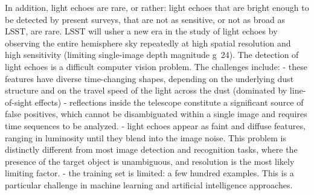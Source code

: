 \documentclass{proposalnsf}
\begin{document}
In addition, light echoes are rare, or rather: light echoes that are bright enough to be detected by present surveys, that are not as sensitive, or not as broad as LSST, are rare. LSST will usher a new era in the study of light echoes by observing the entire hemisphere sky repeatedly at high spatial resolution and high sensitivity (limiting single-image depth magnitude g~24). 
The detection of light echoes is a difficult computer vision problem.  The challenges include:
- these features have diverse time-changing shapes, depending on the underlying dust structure and on the travel speed of the light across the dust (dominated by line-of-sight effects)
- reflections inside the telescope constitute a significant source of false positives, which cannot be disambiguated within a single image and requires time sequences to be analyzed.
- light echoes appear as faint and diffuse features, ranging in luminosity until they blend into the image noise.  This problem is distinctly different from most image detection and recognition tasks, where the presence of the target object is unambiguous, and resolution is the most likely limiting factor.  
- the training set is limited: a few hundred examples.  This is a particular challenge in machine learning and artificial intelligence approaches. 
\end{document}
